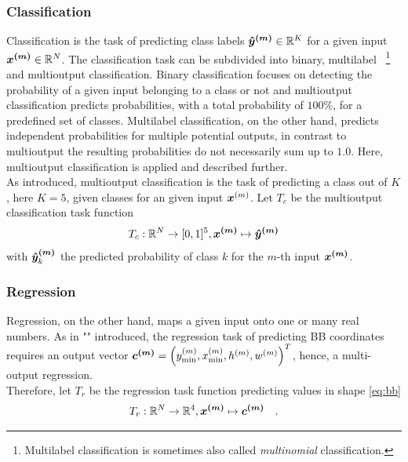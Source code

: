 \subsubsection{Classification}
Classification is the task of predicting class labels $\bm{\hat{y}^{(m)}}\in\mathbb{R}^K$ for a given input $\bm{x^{(m)}}\in\mathbb{R}^N$.
The classification task can be subdivided into binary, multilabel
~\footnote{
    Multilabel classification is sometimes also called \textit{multinomial} classification.
}
and multioutput classification.
Binary classification focuses on detecting the probability of a given input belonging to a class or not and multioutput classification predicts probabilities, with a total probability of $100\%$, for a predefined set of classes.
Multilabel classification, on the other hand, predicts independent probabilities for multiple potential outputs, in contrast to multioutput the resulting probabilities do not necessarily sum up to $1.0$.
Here, multioutput classification is applied and described further.\\
As introduced, multioutput classification is the task of predicting a class out of $K$, here $K=5$, given classes for an given input $\bm{x}^{(m)}$.
Let $T_c$ be the multioutput classification task function
\begin{align}
    T_c: \mathbb{R}^{N}\rightarrow [0,1]^{5}, \bm{x^{(m)}} \mapsto \bm{\hat{y}^{(m)}}
\end{align}
 with $\bm{\hat{y}^{(m)}}_k$ the predicted probability of class $k$ for the $m$-th input $\bm{x^{(m)}}$.

\subsubsection{Regression}
Regression, on the other hand, maps a given input onto one or many real numbers.
As in "" introduced, the regression task of predicting BB coordinates requires an output vector $\bm{c^{(m)}} = \left(y_{\min}^{(m)}, x_{\min}^{(m)}, h^{(m)}, w^{(m)}\right)^T$, hence, a multi-output regression.\\
Therefore, let $T_r$ be the regression task function predicting values in shape \eqref{eq:bb}
\begin{align}
 T_r: \mathbb{R}^{N}\rightarrow \mathbb{R}^{4}, \bm{x^{(m)}} \mapsto \bm{c^{(m)}}\quad .
\end{align}


